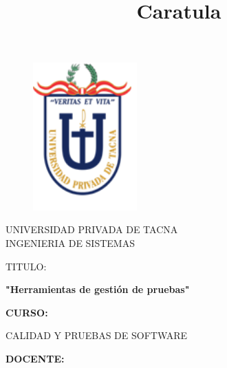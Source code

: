 \documentclass[12pt,letterpaper]{article}
\begin{document}
\title{Caratula}
\begin{titlepage}
\begin{figure}[htb]
\begin{center}
\includegraphics[width=4cm]{./Imagenes/logo.png}
\end{center}
\end{figure}
\vspace*{-0.25in}
\begin{center}
\large{UNIVERSIDAD PRIVADA DE TACNA}\\
\vspace*{-0.025in}
INGENIERIA DE SISTEMAS  \\

\vspace*{0.5in}
\begin{large}
TITULO:\\
\end{large}

\vspace*{0.1in}
\begin{Large}

\textbf{"Herramientas de gestión de pruebas"} \\
\end{Large}

\vspace*{0.3in}
\begin{Large}
\textbf{CURSO:} \\
\end{Large}

\vspace*{0.1in}
\begin{large}
CALIDAD Y PRUEBAS DE SOFTWARE\\
\end{large}

\vspace*{0.3in}
\begin{Large}
\textbf{DOCENTE:} \\
\end{Large}


\end{center}
\end{titlepage}
\end{document}
